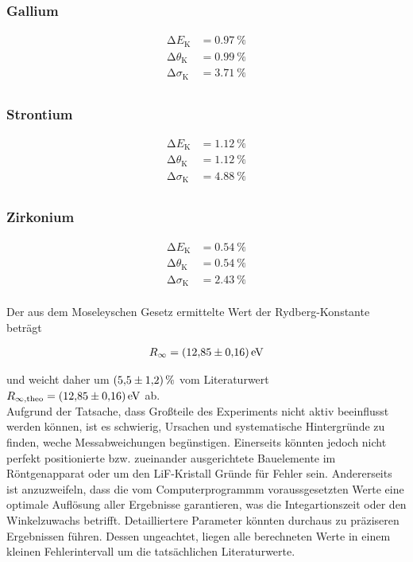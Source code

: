 \subsubsection{Gallium}

\begin{align*}
    \increment{}E_\text{K} &= \qty{0.97}{\percent} \\
    \increment{}\theta_\text{K} &= \qty{0.99}{\percent} \\ 
    \increment{}\sigma_\text{K} &= \qty{3.71}{\percent} \\
\end{align*}

\subsubsection{Strontium}

\begin{align*}
    \increment{}E_\text{K} &= \qty{1.12}{\percent} \\
    \increment{}\theta_\text{K} &= \qty{1.12}{\percent} \\ 
    \increment{}\sigma_\text{K} &= \qty{4.88}{\percent} \\
\end{align*}

\subsubsection{Zirkonium}

\begin{align*}
    \increment{}E_\text{K} &= \qty{0.54}{\percent} \\
    \increment{}\theta_\text{K} &= \qty{0.54}{\percent} \\ 
    \increment{}\sigma_\text{K} &= \qty{2.43}{\percent} \\
\end{align*}

\noindent Der aus dem Moseleyschen Gesetz ermittelte Wert der Rydberg-Konstante beträgt 

\begin{align*}
    R_\infty  =\qty{12.85\pm0.16}{\electronvolt}
\end{align*}

\noindent und weicht daher um $\qty{5.5\pm1.2}{\percent}$ vom Literaturwert $R_{\infty,\text{theo}}  =\qty{12.85\pm0.16}{\electronvolt}$\cite{Rydberg} ab.\\

\noindent Aufgrund der Tatsache, dass Großteile des Experiments nicht aktiv beeinflusst werden können, ist es schwierig, Ursachen 
und systematische Hintergründe zu finden, weche Messabweichungen begünstigen. Einerseits könnten jedoch nicht perfekt positionierte bzw. 
zueinander ausgerichtete Bauelemente im Röntgenapparat oder um den LiF-Kristall Gründe für Fehler sein. Andererseits ist anzuzweifeln, 
dass die vom Computerprogrammm voraussgesetzten Werte eine optimale Auflösung aller Ergebnisse garantieren, was die Integartionszeit oder 
den Winkelzuwachs betrifft. Detailliertere Parameter könnten durchaus zu präziseren Ergebnissen führen. Dessen ungeachtet, liegen 
alle berechneten Werte in einem kleinen Fehlerintervall um die tatsächlichen Literaturwerte.


%




